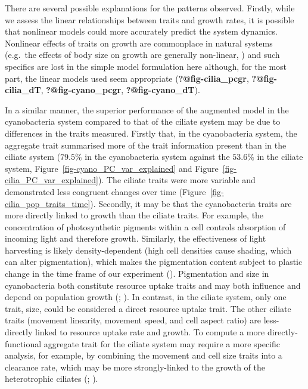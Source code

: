 \documentclass[
  letterpaper,
  DIV=11,
  numbers=noendperiod]{scrartcl}
\begin{document}
There are several possible explanations for the patterns observed.
Firstly, while we assess the linear relationships between traits and
growth rates, it is possible that nonlinear models could more accurately
predict the system dynamics. Nonlinear effects of traits on growth are
commonplace in natural systems (e.g.~the effects of body size on growth
are generally non-linear,
) and such specifics are lost in the simple model formulation here
although, for the most part, the linear models used seem appropriate
(\textbf{?@fig-cilia\_pcgr}, \textbf{?@fig-cilia\_dT},
\textbf{?@fig-cyano\_pcgr}, \textbf{?@fig-cyano\_dT}).

In a similar manner, the superior performance of the augmented model in
the cyanobacteria system compared to that of the ciliate system may be
due to differences in the traits measured. Firstly that, in the
cyanobacteria system, the aggregate trait summarised more of the trait
information present than in the ciliate system (\(79.5\%\) in the
cyanobacteria system against the \(53.6\%\) in the ciliate system,
Figure~\ref{fig-cyano_PC_var_explained} and
Figure~\ref{fig-cilia_PC_var_explained}). The ciliate traits were more
variable and demonstrated less congruent changes over time
(Figure~\ref{fig-cilia_pop_traits_time}). Secondly, it may be that the
cyanobacteria traits are more directly linked to growth than the ciliate
traits. For example, the concentration of photosynthetic pigments within
a cell controls absorption of incoming light and therefore growth.
Similarly, the effectiveness of light harvesting is likely
density-dependent (high cell densities cause shading, which can alter
pigmentation), which makes the pigmentation content subject to plastic
change in the time frame of our experiment
(). Pigmentation and size in
cyanobacteria both constitute resource uptake traits and may both
influence and depend on population growth
(;
). In contrast, in the
ciliate system, only one trait, size, could be considered a direct
resource uptake trait. The other ciliate traits (movement linearity,
movement speed, and cell aspect ratio) are less-directly linked to
resource uptake rate and growth. To compute a more directly-functional
aggregate trait for the ciliate system may require a more specific
analysis, for example, by combining the movement and cell size traits
into a clearance rate, which may be more strongly-linked to the growth
of the heterotrophic ciliates (; ).
\end{document}

